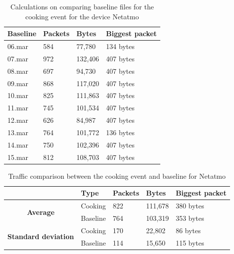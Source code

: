 \begin{table}[H]
    \centering
    \caption{Calculations on comparing baseline files for the cooking event for the device Netatmo}
    \begin{tabular}{|l|l|l|l|}
    \hline
        \textbf{Baseline} & \textbf{Packets} & \textbf{Bytes} & \textbf{Biggest packet} \\ \hline
        06.mar & 584 & 77,780 & 134 bytes\\ \hline
        07.mar & 972 & 132,406 & 407 bytes\\ \hline
        08.mar & 697 & 94,730 & 407 bytes \\ \hline
        09.mar & 868 & 117,020 & 407 bytes \\ \hline
        10.mar & 825 & 111,863 & 407 bytes \\ \hline
        11.mar & 745 & 101,534 & 407 bytes \\ \hline
        12.mar & 626 & 84,987 & 407 bytes \\ \hline
        13.mar & 764 & 101,772 & 136 bytes \\ \hline
        14.mar & 750 & 102,396 & 407 bytes \\ \hline
        15.mar & 812 & 108,703 & 407 bytes \\ \hline
    \end{tabular}
    \label{tab:NetatmoBaselineCookingCalculations}
\end{table}

\begin{table}[H]
    \centering
    \caption{Traffic comparison between the cooking event and baseline for Netatmo}
    \begin{tabular}{c|l|l|l|l|}
        \cline{2-5}
        \multicolumn{1}{l|}{}                                              & \textbf{Type} & \textbf{Packets} & \textbf{Bytes} & \textbf{Biggest packet} \\ \hline
        \multicolumn{1}{|c|}{\multirow{2}{*}{\textbf{Average}}}            & Cooking         & 822              & 111,678        & 380 bytes               \\ \cline{2-5} 
        \multicolumn{1}{|c|}{}                                             & Baseline      & 764              & 103,319        & 353 bytes                \\ \hline
        \multicolumn{1}{|c|}{\multirow{2}{*}{\textbf{Standard deviation}}} & Cooking         & 170              & 22,802         & 86 bytes                 \\ \cline{2-5} 
        \multicolumn{1}{|c|}{}                                             & Baseline      & 114              & 15,650         & 115 bytes               \\ \hline          
    \end{tabular}
    \label{tab:NetatmoComparingBaselineAndCookingCalculations}
\end{table}

